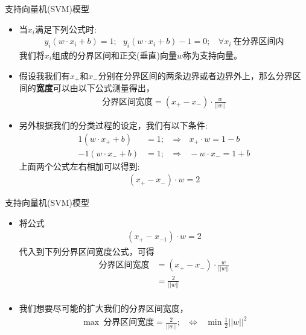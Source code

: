 \documentclass[handout]{ctexbeamer}
\begin{document}
\begin{frame}{支持向量机(SVM)模型}
	\begin{itemize}
		\item 当$x_i$满足下列公式时:
	\begin{align*}
		y_i(w \cdot x_i + b) = 1; \ \ \ y_i(w \cdot x_i + b) - 1 = 0; \ \ \ \   \forall x_i \  \text{在分界区间内}
	\end{align*}
	我们将$x_i$组成的分界区间和正交(垂直)向量$w$称为支持向量。
	\item 假设我我们有$x_{+}$和$x_{-}$分别在分界区间的两条边界或者边界外上，那么分界区间的\textbf{宽度}可以由以下公式测量得出，
	\begin{align*}
		\text{分界区间宽度} = (x_{+} - x_{-}) \cdot \frac{w}{||w||}
	\end{align*}
	\item 另外根据我们的分类过程的设定，我们有以下条件: 
	\begin{align*}
		1(w \cdot x_{+} +b ) & = 1; \ \ \  \Rightarrow \ \ \  x_{+} \cdot w = 1 - b  \\
		-1(w \cdot x_{-} + b) & = 1; \ \ \ \Rightarrow \ \ \ -w \cdot x_{-} = 1 + b 
	\end{align*}
	上面两个公式左右相加可以得到:
	\begin{align*}
		(x_{+} - x_{-} ) \cdot w = 2 
	\end{align*}
	\end{itemize}
\end{frame}


\begin{frame}{支持向量机(SVM)模型}
\begin{itemize}
	\item 将公式
\begin{align*}
	(x_{+} - x_{-1}) \cdot w = 2 
\end{align*}	
代入到下列分界区间宽度公式，可得
\begin{align*}
	\text{分界区间宽度} & = (x_{+} - x_{-}) \cdot \frac{w}{||w||} \\
	& =  \frac{2}{||w||} \\
\end{align*}
\item 我们想要尽可能的扩大我们的分界区间宽度，
	\begin{align*}
		\max \ \text{分界区间宽度} =  \frac{2}{||w||}; \ \ \ \Leftrightarrow \ \ \ \min \frac{1}{2} ||w||^2
	\end{align*}
\end{itemize}
\end{frame}
\end{document}
